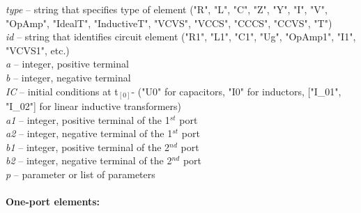 \documentclass[11pt]{article}
\begin{document}
\emph{type} \textrm{--} string that specifies type of element ("R", "L",
"C", "Z", "Y", "I", "V", "OpAmp", "IdealT",
"InductiveT", "VCVS", "VCCS", "CCCS", "CCVS", "T")\\[1ex]
\emph{id} \textrm{--} string that identifies circuit element ("R1", "L1",
"C1", "Ug", "OpAmp1", "I1", "VCVS1", etc.)\\[1ex]
\emph{a} \textrm{--} integer, positive terminal\\[1ex]
\emph{b} \textrm{--} integer, negative terminal\\[1ex]
\emph{IC} \textrm{--} initial conditions at t\(_{[0]}\)- ("U0" for capacitors, "I0"
for inductors, {[}"I\_01", "I\_02"{]} for linear inductive transformers)\\[1ex]
\emph{a1} \textrm{--} integer, positive terminal of the 1\(^{st}\) port\\[1ex]
\emph{a2} \textrm{--} integer, negative terminal of the 1\(^{st}\) port\\[1ex]
\emph{b1} \textrm{--} integer, positive terminal of the 2\(^{nd}\) port\\[1ex]
\emph{b2} \textrm{--} integer, negative terminal of the 2\(^{nd}\) port\\[1ex]
\emph{p} \textrm{--} parameter or list of parameters

\hypertarget{one-port-elements}{%
\paragraph{One-port elements:}\label{one-port-elements}}
\end{document}
